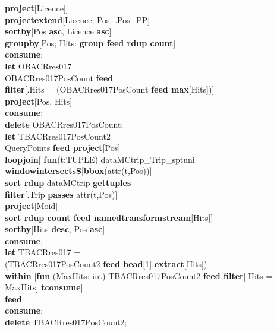 \documentclass[a4paper]{article}
\newcommand{\op}[1]{\textbf{#1}}
\begin{document}
\begin{scriptsize}
\begin{tabbing}
\>\>\op{project}[Licence]]\\
\>\op{projectextend}[Licence; Pos: .Pos\_PP]\\
\>\op{sortby}[Pos \op{asc}, Licence \op{asc}]\\
\>\op{groupby}[Pos; Hits: \op{group feed rdup count}]\\
\op{consume};\\
\op{let} OBACRres017 =\\
\>OBACRres017PosCount \op{feed}\\
\>\op{filter}[.Hits = (OBACRres017PosCount \op{feed max}[Hits])]\\
\>\op{project}[Pos, Hits]\\
\op{consume};\\
\op{delete} OBACRres017PosCount;
\\
\op{let} TBACRres017PosCount2 =\\
\>QueryPoints \op{feed project}[Pos]\\
\>\op{loopjoin}[ \op{fun}(t:TUPLE) dataMCtrip\_Trip\_sptuni \op{windowintersectsS}[\op{bbox}(attr(t,Pos))]\\
\>\>\op{sort rdup} dataMCtrip \op{gettuples}\\
\>\>\op{filter}[.Trip \op{passes} attr(t,Pos)]\\
\>\>\op{project}[Moid]\\
\>\>\op{sort rdup count feed namedtransformstream}[Hits]]\\
\>\op{sortby}[Hits \op{desc}, Pos \op{asc}]\\
\op{consume};\\
\op{let} TBACRres017 =\\
\>(TBACRres017PosCount2 \op{feed head}[1] \op{extract}[Hits])\\
\>\>\op{within} [\op{fun} (MaxHits: int) TBACRres017PosCount2 \op{feed filter}[.Hits = MaxHits] \op{tconsume}]\\
\>\op{feed}\\
\op{consume};\\
\op{delete} TBACRres017PosCount2;\\
\end{tabbing}
\end{scriptsize}
\end{document}
